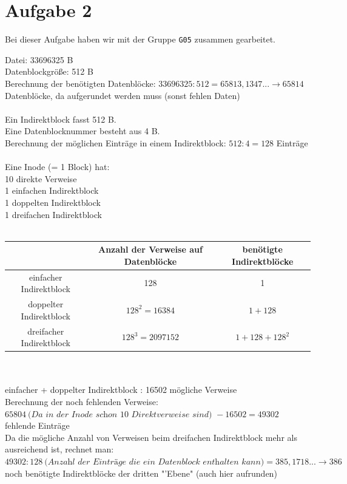 \documentclass{ti2}
\begin{document}
\newpage
\section*{Aufgabe 2}
Bei dieser Aufgabe haben wir mit der Gruppe \texttt{G05} zusammen gearbeitet.

Datei: 33696325 B \\
Datenblockgröße: 512 B \\
Berechnung der benötigten Datenblöcke: $33696325 : 512 = 65813,1347... \rightarrow 65814$ Datenblöcke, da aufgerundet werden muss (sonst fehlen Daten) \\\\
Ein Indirektblock fasst 512 B. \\
Eine Datenblocknummer besteht aus 4 B. \\
Berechnung der möglichen Einträge in einem Indirektblock: $512 : 4 = 128$ Einträge \\\\
Eine Inode (= 1 Block) hat: \\
10 direkte Verweise \\
1 einfachen Indirektblock \\
1 doppelten Indirektblock \\
1 dreifachen Indirektblock \\\\
\begin{tabular}[h]{|c|c|c|}
	\hline
	 & Anzahl der Verweise auf Datenblöcke & benötigte Indirektblöcke \\
	\hline
	\hline
	einfacher Indirektblock & 128 & 1 \\
	\hline
	doppelter Indirektblock & $128^2 = 16384$ & $1 + 128$ \\
	\hline
	dreifacher Indirektblock & $128^3 = 2097152$ & $1 + 128 + 128^2$ \\
	\hline
\end{tabular} \\\\
einfacher + doppelter Indirektblock : 16502 mögliche Verweise \\
Berechnung der noch fehlenden Verweise: $65804 ~\textit{(Da in der Inode schon 10 Direktverweise sind) } - 16502 = 49302$ fehlende Einträge \\
Da die mögliche Anzahl von Verweisen beim dreifachen Indirektblock mehr als ausreichend ist, rechnet man: \\
$49302 : 128 ~\textit{(Anzahl der Einträge die ein Datenblock enthalten kann)} = 385,1718... \rightarrow 386$ noch benötigte Indirektblöcke der dritten "'Ebene" (auch hier aufrunden)\\
\end{document}
